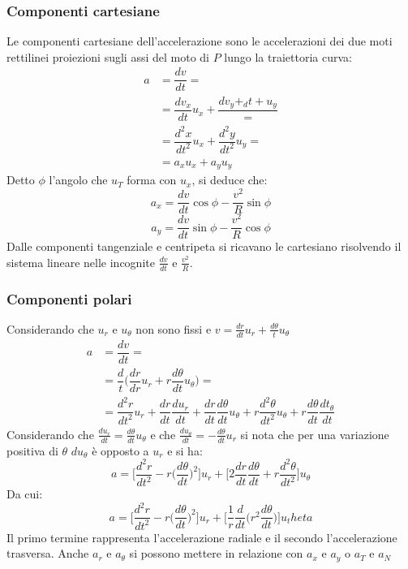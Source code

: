 		\subsubsection{Componenti cartesiane}
		Le componenti cartesiane dell'accelerazione sono le accelerazioni dei due moti rettilinei proiezioni sugli assi del moto di $P$ lungo la traiettoria curva:
		\begin{align*}
			a&=\dfrac{dv}{dt}=\\
			 &=\dfrac{dv_x}{dt}u_x+\dfrac{dv_y+_dt+u_y}=\\
			 &=\dfrac{d^2x}{dt^2}u_x+\dfrac{d^2y}{dt^2}u_y=\\
			 &=a_xu_x+a_yu_y
		\end{align*}
		Detto $\phi$ l'angolo che $u_T$ forma con $u_x$, si deduce che:
		$$a_x=\dfrac{dv}{dt}\cos\phi - \dfrac{v^2}{R}\sin\phi$$
		$$a_y=\dfrac{dv}{dt}\sin\phi - \dfrac{v^2}{R}\cos\phi$$
		Dalle componenti tangenziale e centripeta si ricavano le cartesiano risolvendo il sistema lineare nelle incognite $\frac{dv}{dt}$ e $\frac{v^2}{R}$.

		\subsubsection{Componenti polari}
		Considerando che $u_r$ e $u_\theta$ non sono fissi e $v=\frac{dr}{dt}u_r+\frac{d\theta}{t}u_\theta$
		\begin{align*}
			a&=\dfrac{dv}{dt}=\\
			 &=\dfrac{d}{t}\biggl(\dfrac{dr}{dr}u_r+r\dfrac{d\theta}{dt}u_\theta\biggr)=\\
			 &=\dfrac{d^2r}{dt^2}u_r+\dfrac{dr}{dt}\dfrac{du_r}{dt}+\dfrac{dr}{dt}\dfrac{d\theta}{dt}u_\theta+r\dfrac{d^2\theta}{dt^2}u_\theta+r\dfrac{d\theta}{dt}\dfrac{dt_\theta}{dt}
		\end{align*}
		Considerando che $\frac{du_r}{dt}=\frac{d\theta}{dt}u_\theta$ e che $\frac{du_\theta}{dt}=-\frac{d\theta}{dt}u_r$ si nota che per una variazione positiva di $\theta$ $du_\theta$ \`e opposto a $u_r$  e si ha:
		$$a=\biggl[\dfrac{d^2r}{dt^2}-r\biggl(\dfrac{d\theta}{dt}\biggr)^2\biggr]u_r+\biggl[2\dfrac{dr}{dt}\dfrac{d\theta}{dt}+r\dfrac{d^2\theta}{dt^2}\biggr]u_\theta$$
		Da cui:
		$$a=\biggl[\dfrac{d^2r}{dt^2}-r\biggl(\dfrac{d\theta}{dt}\biggr)^2\biggr]u_r+\biggl[\dfrac{1}{r}\dfrac{d}{dt}\biggl(r^2\dfrac{d\theta}{dt}\biggr)\biggr]u_theta$$
		Il primo termine rappresenta l'accelerazione radiale e il secondo l'accelerazione trasversa.
		Anche $a_r$ e $a_\theta$ si possono mettere in relazione con $a_x$ e $a_y$ o $a_T$ e $a_N$

